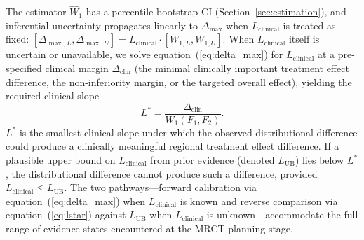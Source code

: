 \documentclass[AMA,Times1COL]{WileyNJDv5}
\begin{document}
The estimator $\widehat{W}_1$ has a percentile bootstrap CI (Section~\ref{sec:estimation}), and inferential uncertainty propagates linearly to $\Delta_{\max}$ when $L_{\text{clinical}}$ is treated as fixed: $[\Delta_{\max,L}, \Delta_{\max,U}] = L_{\text{clinical}} \cdot [W_{1,L}, W_{1,U}]$. When $L_{\text{clinical}}$ itself is uncertain or unavailable, we solve equation~(\ref{eq:delta_max}) for $L_{\text{clinical}}$ at a pre-specified clinical margin $\Delta_{\text{clin}}$ (the minimal clinically important treatment effect difference, the non-inferiority margin, or the targeted overall effect), yielding the required clinical slope
\begin{equation}
L^* = \frac{\Delta_{\text{clin}}}{W_1(F_1, F_2)}.
\label{eq:lstar}
\end{equation}
$L^*$ is the smallest clinical slope under which the observed distributional difference could produce a clinically meaningful regional treatment effect difference. If a plausible upper bound on $L_{\text{clinical}}$ from prior evidence (denoted $L_{\text{UB}}$) lies below $L^*$, the distributional difference cannot produce such a difference, provided $L_{\text{clinical}} \leq L_{\text{UB}}$. The two pathways---forward calibration via equation~(\ref{eq:delta_max}) when $L_{\text{clinical}}$ is known and reverse comparison via equation~(\ref{eq:lstar}) against $L_{\text{UB}}$ when $L_{\text{clinical}}$ is unknown---accommodate the full range of evidence states encountered at the MRCT planning stage.
\end{document}
